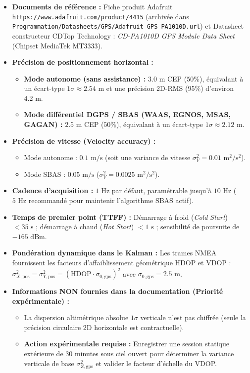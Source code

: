 \documentclass[../Formulations_Kalman.tex]{subfiles}
\begin{document}
\begin{itemize}
    \item \textbf{Documents de référence :} Fiche produit Adafruit \texttt{https://www.adafruit.com/product/4415} (archivée dans \texttt{Programmation/Datasheets/GPS/Adafruit GPS PA1010D.url}) et Datasheet constructeur CDTop Technology : \textit{CD-PA1010D GPS Module Data Sheet} (Chipset MediaTek MT3333).
    \item \textbf{Précision de positionnement horizontal :}
    \begin{itemize}
        \item \textbf{Mode autonome (sans assistance) :} $3.0\text{ m}$ CEP ($50\%$), équivalant à un écart-type $1\sigma \approx 2.54\text{ m}$ et une précision 2D-RMS ($95\%$) d'environ $4.2\text{ m}$.
        \item \textbf{Mode différentiel DGPS / SBAS (WAAS, EGNOS, MSAS, GAGAN) :} $2.5\text{ m}$ CEP ($50\%$), équivalant à un écart-type $1\sigma \approx 2.12\text{ m}$.
    \end{itemize}
    \item \textbf{Précision de vitesse (Velocity accuracy) :}
    \begin{itemize}
        \item Mode autonome : $0.1\text{ m/s}$ (soit une variance de vitesse $\sigma_{V}^2 = 0.01\text{ m}^2/\text{s}^2$).
        \item Mode SBAS : $0.05\text{ m/s}$ ($\sigma_{V}^2 = 0.0025\text{ m}^2/\text{s}^2$).
    \end{itemize}
    \item \textbf{Cadence d'acquisition :} $1\text{ Hz}$ par défaut, paramétrable jusqu'à $10\text{ Hz}$ ($5\text{ Hz}$ recommandé pour maintenir l'algorithme SBAS actif).
    \item \textbf{Temps de premier point (TTFF) :} Démarrage à froid (\textit{Cold Start}) $< 35\text{ s}$ ; démarrage à chaud (\textit{Hot Start}) $< 1\text{ s}$ ; sensibilité de poursuite de $-165\text{ dBm}$.
    \item \textbf{Pondération dynamique dans le Kalman :} Les trames NMEA fournissent les facteurs d'affaiblissement géométrique HDOP et VDOP : $\sigma_{X,\text{pos}}^2 = \sigma_{Y,\text{pos}}^2 = (\text{HDOP} \cdot \sigma_{0,\text{gps}})^2$ avec $\sigma_{0,\text{gps}} = 2.5\text{ m}$.
    \item \textbf{Informations NON fournies dans la documentation (Priorité expérimentale) :}
    \begin{itemize}
        \item La dispersion altimétrique absolue $1\sigma$ verticale n'est pas chiffrée (seule la précision circulaire 2D horizontale est contractuelle).
        \item \textbf{Action expérimentale requise :} Enregistrer une session statique extérieure de 30 minutes sous ciel ouvert pour déterminer la variance verticale de base $\sigma_{Z,\text{gps}}^2$ et valider le facteur d'échelle du VDOP.
    \end{itemize}
\end{itemize}
\end{document}
